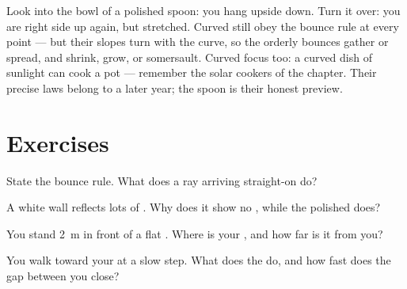 \begin{remark}\label{rem:g5:mirrors-reflection:curved}
Look into the bowl of a polished spoon: you hang upside down.
Turn it over: you are right side up again, but stretched. Curved
 still obey the bounce rule at every point --- but their
slopes turn with the curve, so the orderly bounces gather or
spread, and  shrink, grow, or somersault. Curved 
focus  too: a curved dish of sunlight can cook a pot ---
remember the solar cookers of the  chapter. Their precise
laws belong to a later year; the spoon is their honest preview.
\end{remark}

\section{Exercises}

\begin{exercise}[$\star$]\label{exo:g5:mirrors-reflection:1}
State the bounce rule. What does a ray arriving straight-on do?
\end{exercise}

\begin{exercise}[$\star$]\label{exo:g5:mirrors-reflection:2}
A white wall reflects lots of . Why does it show no ,
while the polished  does?
\end{exercise}

\begin{exercise}[$\star$]\label{exo:g5:mirrors-reflection:3}
You stand \qty{2}{m} in front of a flat . Where is your
, and how far is it from you?
\end{exercise}

\begin{exercise}[$\star$]\label{exo:g5:mirrors-reflection:4}
You walk toward your   at a slow step. What does the
 do, and how fast does the gap between you close?
\end{exercise}

